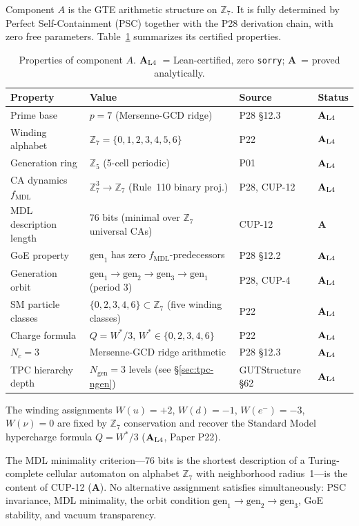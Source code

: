 \documentclass[12pt,letterpaper]{article}
\newcommand{\fmdl}{f_{\mathrm{MDL}}}
\newcommand{\Zseven}{\mathbb{Z}_7}
\newcommand{\Zfive}{\mathbb{Z}_5}
\newcommand{\ngen}{N_{\mathrm{gen}}}
\newcommand{\catAL}{\ensuremath{\textbf{A}_{\rm L4}}}
\newcommand{\catA}{\textbf{A}}
\begin{document}
Component $A$ is the GTE arithmetic structure on $\Zseven$.  It is fully determined
by Perfect Self-Containment (PSC) together with the P28 derivation
chain, with zero free parameters.  Table~\ref{tab:carrier} summarizes its certified
properties.

\begin{table}[h!]
\centering
\small
\begin{tabular}{p{} p{} p{} p{}}
\toprule
\textbf{Property} & \textbf{Value} & \textbf{Source} & \textbf{Status} \\
\midrule
Prime base & $p = 7$ (Mersenne-GCD ridge) & P28 \S12.3 & \catAL \\
Winding alphabet & $\Zseven = \{0,1,2,3,4,5,6\}$ & P22 & \catAL \\
Generation ring & $\Zfive$ (5-cell periodic) & P01 & \catAL \\
CA dynamics $\fmdl$ & $\Zseven^3 \to \Zseven$ (Rule~110 binary proj.) & P28, CUP-12 & \catAL \\
MDL description length & 76 bits (minimal over $\Zseven$ universal CAs) & CUP-12 & \catA \\
GoE property & $\mathrm{gen}_1$ has zero $\fmdl$-predecessors & P28 \S12.2 & \catAL \\
Generation orbit & $\mathrm{gen}_1\!\to\!\mathrm{gen}_2\!\to\!\mathrm{gen}_3\!\to\!\mathrm{gen}_1$ (period 3)
                 & P28, CUP-4 & \catAL \\
SM particle classes & $\{0,2,3,4,6\} \subset \Zseven$ (five winding classes) & P22 & \catAL \\
Charge formula & $Q = W^*/3$, $W^* \in \{0,2,3,4,6\}$ & P22 & \catAL \\
$N_c = 3$ & Mersenne-GCD ridge arithmetic & P28 \S12.3 & \catAL \\
TPC hierarchy depth & $\ngen = 3$ levels (see \S\ref{sec:tpc-ngen}) & GUTStructure \S62 & \catAL \\
\bottomrule
\end{tabular}
\caption{Properties of component $A$.  \catAL\ = Lean-certified, zero \texttt{sorry};
\catA\ = proved analytically.}
\label{tab:carrier}
\end{table}

The winding assignments $W(u) = {+2}$, $W(d) = {-1}$, $W(e^-) = {-3}$,
$W(\nu) = 0$ are fixed by $\Zseven$ conservation and recover the Standard Model
hypercharge formula $Q = W^*/3$ (\catAL, Paper P22).

The MDL minimality criterion---76 bits is the shortest description of a
Turing-complete cellular automaton on alphabet $\Zseven$ with neighborhood
radius~1---is the content of CUP-12 (\catA).  No alternative assignment satisfies
simultaneously: PSC invariance, MDL minimality, the orbit condition
$\mathrm{gen}_1 \to \mathrm{gen}_2 \to \mathrm{gen}_3$, GoE stability, and
vacuum transparency.
\end{document}
